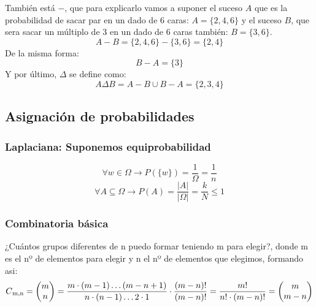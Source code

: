 \documentclass{article}
\begin{document}
También está $-$, que para explicarlo vamos a suponer el suceso $A$ que es la probabilidad de sacar par en un dado de 6 caras: $A=\{2,4,6\}$ y el suceso $B$, que sera sacar un múltiplo de 3 en un dado de 6 caras también: $B=\{3,6\}$. 
\[A-B=\{2,4,6\}-\{3,6\}=\{2,4\}\]
De la misma forma:
\[B-A=\{3\}\]
Y por último, $\Delta$ se define como:
\[A \Delta B = A-B \cup B-A=\{2,3,4\}\]

\subsection{Asignación de probabilidades}
\subsubsection*{Laplaciana: Suponemos equiprobabilidad}
\[\forall w \in \Omega \rightarrow P(\{w\})=\frac{1}{\Omega} = \frac{1}{n} \]
\[\forall A \subseteq \Omega \rightarrow P(A) = \frac{|A|}{|\Omega|} = \frac{k}{N}\leq 1\]

\subsubsection*{Combinatoria básica}

¿Cuántos grupos diferentes de n puedo formar teniendo m para elegir?, donde m es el nº de elementos para elegir y n el nº de elementos que elegimos, formando asi:
\[C\textsubscript{m,n}=\begin{pmatrix}m \\ n\end{pmatrix} = \frac{m\cdot (m-1) \ldots (m-n+1)}{n\cdot (n-1) \ldots 2 \cdot 1} \cdot \frac{(m-n)!}{(m-n)!}=\frac{m!}{n!\cdot (m-n)!}=\begin{pmatrix}m\\m-n\end{pmatrix}\]
\end{document}
